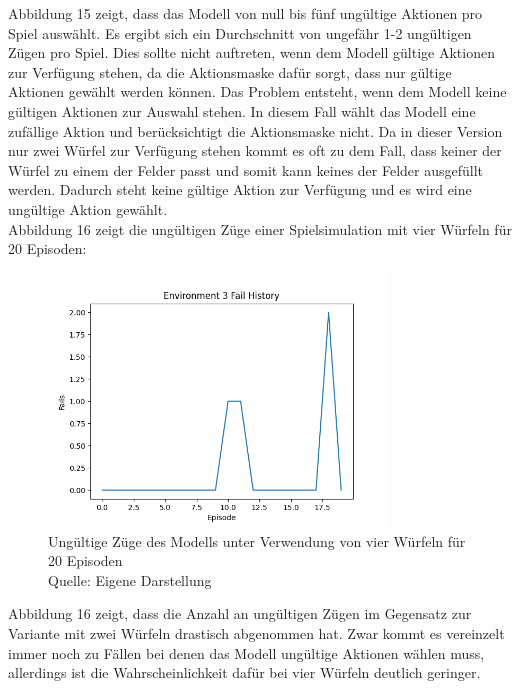 Abbildung 15 zeigt, dass das Modell von null bis fünf ungültige Aktionen pro Spiel auswählt. Es ergibt sich ein Durchschnitt von ungefähr 1-2 ungültigen Zügen pro Spiel. Dies sollte nicht auftreten, wenn dem Modell gültige Aktionen zur Verfügung stehen, da die Aktionsmaske dafür sorgt, dass nur gültige Aktionen gewählt werden können. Das Problem entsteht, wenn dem Modell keine gültigen Aktionen zur Auswahl stehen. In diesem Fall wählt das Modell eine zufällige Aktion und berücksichtigt die Aktionsmaske nicht. Da in dieser Version nur zwei Würfel zur Verfügung stehen kommt es oft zu dem Fall, dass keiner der Würfel zu einem der Felder passt und somit kann keines der Felder ausgefüllt werden. Dadurch steht keine gültige Aktion zur Verfügung und es wird eine ungültige Aktion gewählt.\\

Abbildung 16 zeigt die ungültigen Züge einer Spielsimulation mit vier Würfeln für 20 Episoden:
\nopagebreak
\begin{figure}[H]
	\centering
	\includegraphics[width=0.8\textwidth]{Bilder/failswithfourdice} 
	\caption[Ungültige Züge des Modells unter Verwendung von vier Würfeln für 20 Episoden]{Ungültige Züge des Modells unter Verwendung von vier Würfeln für 20 Episoden\\ Quelle: Eigene Darstellung}
\end{figure}

Abbildung 16 zeigt, dass die Anzahl an ungültigen Zügen im Gegensatz zur Variante mit zwei Würfeln drastisch abgenommen hat. Zwar kommt es vereinzelt immer noch zu Fällen bei denen das Modell ungültige Aktionen wählen muss, allerdings ist die Wahrscheinlichkeit dafür bei vier Würfeln deutlich geringer.
